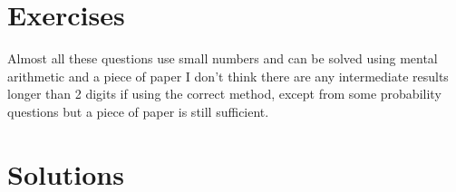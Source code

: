\documentclass[11pt,a4paper]{article}
\newif\ifshowanswers
\begin{document}
\section*{Exercises}
Almost all  these questions use small numbers and can be solved using mental arithmetic and a piece of paper I don't think there are any intermediate results longer than 2 digits if using the correct method, except from some probability questions but a piece of paper is still sufficient.
\twocolumn
\showanswersfalse


\pagebreak
\section*{Solutions}
\showanswerstrue



\printbibliography
\end{document}
